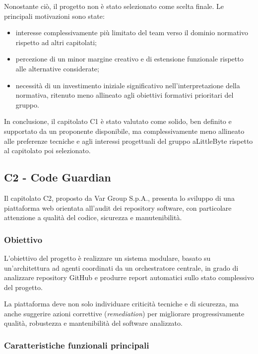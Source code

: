 \documentclass[a4paper,12pt]{article}
\begin{document}
Nonostante ciò, il progetto non è stato selezionato come scelta finale. Le principali motivazioni sono state:

\begin{itemize}
    \item interesse complessivamente più limitato del team verso il dominio normativo rispetto ad altri capitolati;
    \item percezione di un minor margine creativo e di estensione funzionale rispetto alle alternative considerate;
    \item necessità di un investimento iniziale significativo nell'interpretazione della normativa, ritenuto meno allineato agli obiettivi formativi prioritari del gruppo.
\end{itemize}

In conclusione, il capitolato C1 è stato valutato come solido, ben definito e supportato da un proponente disponibile, ma complessivamente meno allineato alle preferenze tecniche e agli interessi progettuali del gruppo aLittleByte rispetto al capitolato poi selezionato.

\subsection{C2 - Code Guardian}

Il capitolato C2, proposto da Var Group S.p.A., presenta lo sviluppo di una piattaforma web orientata all'audit dei repository software, con particolare attenzione a qualità del codice, sicurezza e manutenibilità.

\subsubsection{Obiettivo}

L'obiettivo del progetto è realizzare un sistema modulare, basato su un'architettura ad agenti coordinati da un orchestratore centrale, in grado di analizzare repository GitHub e produrre report automatici sullo stato complessivo del progetto.

La piattaforma deve non solo individuare criticità tecniche e di sicurezza, ma anche suggerire azioni correttive (\textit{remediation}) per migliorare progressivamente qualità, robustezza e mantenibilità del software analizzato.

\subsubsection{Caratteristiche funzionali principali}
\end{document}
